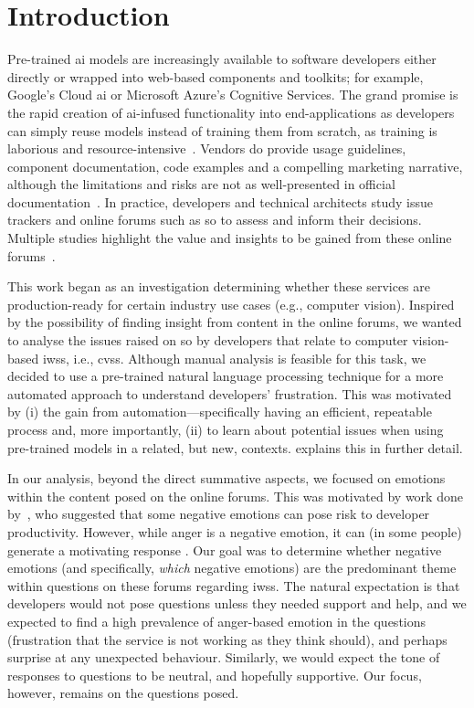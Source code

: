 \section{Introduction}
Pre-trained \gls{ai} models are increasingly available to software developers either directly or wrapped into web-based components and toolkits; for example, Google's Cloud \gls{ai} or Microsoft Azure's Cognitive Services. The grand promise is the rapid creation of \gls{ai}-infused functionality into end-applications as developers can simply reuse models instead of training them from scratch, as training is laborious and resource-intensive~\citep{RamanAnandHoder2015}. Vendors do provide usage guidelines, component documentation, code examples and a compelling marketing narrative, although the limitations and risks are not as well-presented in  official documentation~\citep{Cummaudo:2019icsme,Cummaudo:2020icse}. 
In practice, developers and technical architects study issue trackers and online forums such as \gls{so} to assess and inform their decisions.  Multiple studies highlight the value and insights to be gained from these online forums~\citep{Abdalkareem2017WhatOverflow,Storey2014,Cummaudo:2020icse}.

This work began as an investigation determining whether these services are production-ready for certain industry use cases (e.g., computer vision). Inspired by the possibility of finding insight from content in the online forums, we wanted to analyse the issues raised on \gls{so} by developers that relate to computer vision-based \glspl{iws}, i.e., \glspl{cvs}.  Although manual analysis is feasible for this task, we decided to use a pre-trained natural language processing technique for a more automated approach to understand developers' frustration. This was motivated by (i) the gain from automation---specifically having an efficient,  repeatable process and, more importantly, (ii) to learn about potential issues when using pre-trained models in a related, but new, contexts.  explains this in further detail.

In our analysis, beyond the direct summative aspects, we focused on emotions within the content posed on the online forums. This was motivated by work done by~\citet{wrobel2013}, who suggested that some negative emotions can pose risk to developer productivity. However, while anger is a negative emotion, it can (in some people) generate a motivating response \citep{wrobel2013}. Our goal was to determine whether negative emotions (and specifically, \textit{which} negative emotions) are the predominant theme within questions on these forums regarding \glspl{iws}.  The natural expectation is that developers would not pose questions unless they needed support and help, and we expected to find a high prevalence of anger-based emotion in the questions (frustration that the service is not working as they think should), and perhaps surprise at any unexpected behaviour. Similarly, we would expect the tone of responses to questions to be neutral, and hopefully supportive. Our focus, however, remains on the questions posed.

